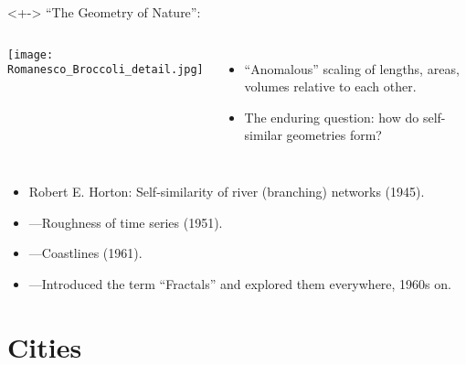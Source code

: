 \begin{frame}
  
  \small
  \begin{block}<+->{ ``The Geometry of Nature'': }
    \begin{columns}
      \texttt{[image: Romanesco\_Broccoli\_detail.jpg]}\footnotemark[4]
      \begin{itemize}
      \item 
        ``Anomalous'' scaling of lengths, areas, volumes relative to each other.
      \item<+-> 
        The enduring question: how do self-similar geometries form?
      \end{itemize}
    \end{columns}
    \begin{itemize}
    \item<+-> 
      {Robert E. Horton}: Self-similarity of river (branching) networks (1945).\cite{horton1945a}
    \item<+->
      ---Roughness of time series (1951).\cite{hurst1951a}
    \item<+-> 
      ---Coastlines (1961).
    \item<+->
      ---Introduced the term ``Fractals'' and explored
      them everywhere, 1960s on.\cite{mandelbrot1967a,mandelbrot1977a,mandelbrot1983a}
    \end{itemize}


  \end{block}
\end{frame}


\section{Cities}

